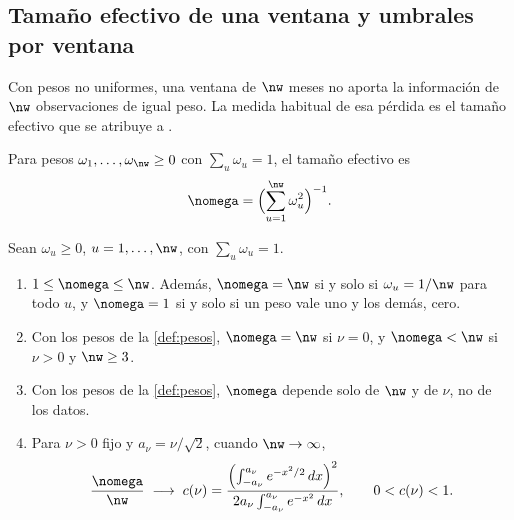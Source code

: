 \subsection{Tamaño efectivo de una ventana y umbrales por ventana}
\label{sec:kish}

Con pesos no uniformes, una ventana de $\nw$ meses no aporta la información de $\nw$
observaciones de igual peso. La medida habitual de esa pérdida es el tamaño efectivo que se
atribuye a \textcite{kish_1965}.

\begin{definicion}\label{def:kish}
Para pesos $\omega_1,\dots,\omega_{\nw}\ge0$ con $\sum_u\omega_u=1$, el tamaño efectivo es
\begin{equation}\label{eq:kish}
  \nomega=\Bigl(\sum_{u=1}^{\nw}\omega_u^2\Bigr)^{-1}.
\end{equation}
\end{definicion}

\begin{proposicion}\label{prop:kish}
Sean $\omega_u\ge0$, $u=1,\dots,\nw$, con $\sum_u\omega_u=1$.
\begin{enumerate}[label=(\alph*)]
  \item $1\le\nomega\le\nw$. Además, $\nomega=\nw$ si y solo si $\omega_u=1/\nw$ para todo $u$, y
    $\nomega=1$ si y solo si un peso vale uno y los demás, cero.
  \item Con los pesos de la \cref{def:pesos}, $\nomega=\nw$ si $\nu=0$, y $\nomega<\nw$ si $\nu>0$
    y $\nw\ge3$.
  \item Con los pesos de la \cref{def:pesos}, $\nomega$ depende solo de $\nw$ y de $\nu$, no de los
    datos.
  \item Para $\nu>0$ fijo y $a_\nu=\nu/\sqrt2$, cuando $\nw\to\infty$,
    \[
      \frac{\nomega}{\nw}\;\longrightarrow\;c(\nu)=
      \frac{\Bigl(\int_{-a_\nu}^{a_\nu}e^{-x^2/2}\,dx\Bigr)^2}{2a_\nu\int_{-a_\nu}^{a_\nu}e^{-x^2}\,dx},
      \qquad 0<c(\nu)<1 .
    \]
\end{enumerate}
\end{proposicion}

